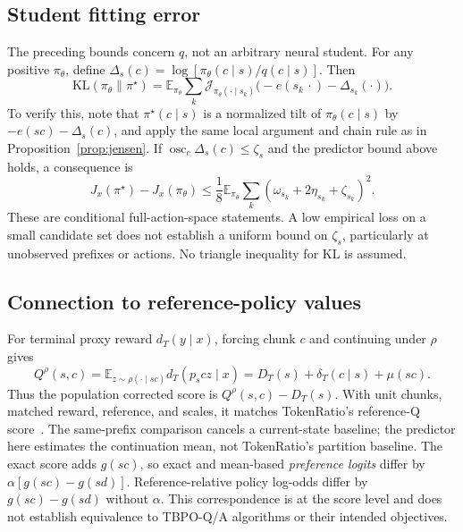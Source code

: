 \documentclass[pdflatex,sn-mathphys-num,review]{sn-jnl}
\theoremstyle{thmstyleone}
\theoremstyle{thmstyletwo}
\theoremstyle{thmstylethree}
\providecommand{\pth}{\pi_{\theta}}
\providecommand{\popt}{\pi^{\star}}
\providecommand{\E}{\mathbb{E}}
\providecommand{\KL}{\mathrm{KL}}
\providecommand{\osc}{\operatorname{osc}}
\providecommand{\Jg}{\mathcal{J}}
\begin{document}
\subsection{Student fitting error}
\label{subsec:fitting}
The preceding bounds concern $q$, not an arbitrary neural student. For any positive $\pth$, define $\Delta_s(c)=\log[\pth(c\mid s)/q(c\mid s)]$. Then
\begin{equation}
\KL(\pth\|\popt)=\E_{\pth}\sum_k
\Jg_{\pth(\cdot\mid s_k)}\big(-e(s_k\,\cdot)-\Delta_{s_k}(\cdot)\big).
\label{eq:fitting}
\end{equation}
To verify this, note that $\popt(c\mid s)$ is a normalized tilt of $\pth(c\mid s)$ by $-e(sc)-\Delta_s(c)$, and apply the same local argument and chain rule as in Proposition~\ref{prop:jensen}. If $\osc_c\Delta_s(c)\le\zeta_s$ and the predictor bound above holds, a consequence is
\begin{equation}
J_x(\popt)-J_x(\pth)\le\frac18\E_{\pth}\sum_k(\omega_{s_k}+2\eta_{s_k}+\zeta_{s_k})^2.
\label{eq:fitted-bound}
\end{equation}
These are conditional full-action-space statements. A low empirical loss on a small candidate set does not establish a uniform bound on $\zeta_s$, particularly at unobserved prefixes or actions. No triangle inequality for KL is assumed.

\subsection{Connection to reference-policy values}
\label{subsec:tokenratio}
For terminal proxy reward $d_T(y\mid x)$, forcing chunk $c$ and continuing under $\rho$ gives
\begin{equation}
Q^\rho(s,c)=\E_{z\sim\rho(\cdot\mid sc)}d_T(p_scz\mid x)
=D_T(s)+\delta_T(c\mid s)+\mu(sc).
\label{eq:q}
\end{equation}
Thus the population corrected score is $Q^\rho(s,c)-D_T(s)$. With unit chunks, matched reward, reference, and scales, it matches TokenRatio's reference-Q score~\citep{nguyen2026tokenratio}. The same-prefix comparison cancels a current-state baseline; the predictor here estimates the continuation mean, not TokenRatio's partition baseline. The exact score adds $g(sc)$, so exact and mean-based \emph{preference logits} differ by $\alpha[g(sc)-g(sd)]$. Reference-relative policy log-odds differ by $g(sc)-g(sd)$ without $\alpha$. This correspondence is at the score level and does not establish equivalence to TBPO-Q/A algorithms or their intended objectives.
\end{document}
